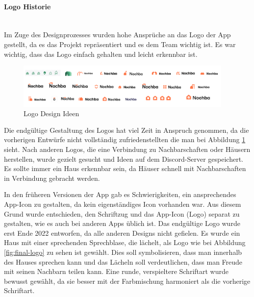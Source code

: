 
\paragraph{Logo Historie}\mbox{} \\


Im Zuge des Designprozesses wurden hohe Ansprüche an das
Logo der App gestellt, da es das Projekt repräsentiert und
es dem Team wichtig ist. Es
war wichtig, dass das Logo einfach gehalten und leicht
erkennbar ist.

\begin{figure}[H]
  \centering
  \includegraphics[width=0.95\textwidth]{pics/logo-historie.png}
  \caption{Logo Design Ideen}
  \label{fig:logo-historie}
\end{figure}

Die endgültige Gestaltung des Logos hat viel Zeit
in Anspruch genommen, da die vorherigen Entwürfe nicht
vollständig zufriedenstellten die man bei Abbildung
\ref{fig:logo-historie} sieht. Nach anderen Logos, die eine
Verbindung zu Nachbarschaften oder Häusern herstellen, wurde
gezielt gesucht und Ideen auf dem Discord-Server
gespeichert. Es sollte immer ein Haus erkennbar sein, da
Häuser schnell mit Nachbarschaften in Verbindung gebracht
werden.

In den früheren Versionen der App gab es Schwierigkeiten,
ein ansprechendes App-Icon zu gestalten, da kein
eigenständiges Icon vorhanden war. Aus diesem Grund wurde
entschieden, den Schriftzug und das App-Icon (Logo) separat
zu gestalten, wie es auch bei anderen Apps üblich ist. Das
endgültige Logo wurde erst Ende 2022 entworfen, da alle
anderen Designs nicht gefielen. Es wurde ein Haus mit einer
sprechenden Sprechblase, die lächelt, als Logo
wie bei Abbildung \ref{fig:final-logo} zu sehen ist gewählt. Dies soll symbolisieren, dass
man innerhalb des Hauses sprechen kann und das Lächeln soll
verdeutlichen, dass man Freude mit seinen Nachbarn teilen
kann. Eine runde, verspieltere Schriftart wurde bewusst
gewählt, da sie besser mit der Farbmischung harmoniert als
die vorherige Schriftart.



